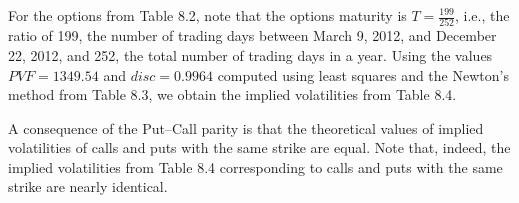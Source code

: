 For the options from Table 8.2, note that the options maturity is $T = \frac{199}{252}$,
i.e., the ratio of 199, the number of trading days between March 9, 2012, and December
22, 2012, and 252, the total number of trading days in a year. Using the values
$PVF = 1349.54$ and $disc = 0.9964$ computed using least squares and the Newton's
method from Table 8.3, we obtain the implied volatilities from Table 8.4.

A consequence of the Put--Call parity is that the theoretical values of implied
volatilities of calls and puts with the same strike are equal. Note that, indeed, the
implied volatilities from Table 8.4 corresponding to calls and puts with the same
strike are nearly identical.

